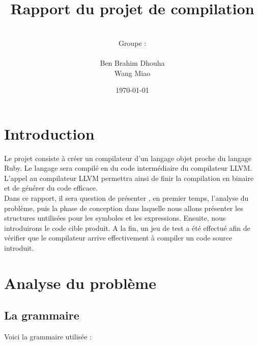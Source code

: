 \documentclass{article}
\date{\vspace{3 cm} \today}
\author{\vspace{4 cm} \\ Groupe :\\ \\Ben Brahim Dhouha\\Wang Miao }
\title{Rapport du projet de compilation \\ }
\begin{document}
\newenvironment{narrow}[2]{%
\begin{list}{}{%
\setlength{\topsep}{0pt}%
\setlength{\leftmargin}{#1}%
\setlength{\rightmargin}{#2}%
\setlength{\listparindent}{\parindent}%
\setlength{\itemindent}{\parindent}%
\setlength{\parsep}{\parskip}%
}%
\item[]}{\end{list}}



\maketitle




\newpage


\section*{Introduction}


Le projet consiste à créer un compilateur d'un langage objet proche du langage Ruby. Le langage sera compilé en du code intermédiaire du compilateur LLVM. L'appel au compilateur LLVM permettra ainsi de finir la compilation en binaire et de générer du code efficace. \\

Dans ce rapport, il sera question de présenter , en premier temps, l'analyse du problème, puis la phase de conception dans laquelle nous allons présenter les structures untilisées pour les symboles et les expressions. Ensuite, nous introduirons le code cible produit.
A la fin, un jeu de test a été effectué afin de vérifier que le compilateur arrive effectivement à compiler un code source introduit.

\newpage
\tableofcontents

\newpage
\section{Analyse du problème}

\subsection{La grammaire}
Voici la grammaire utilisée : 
\end{document}
